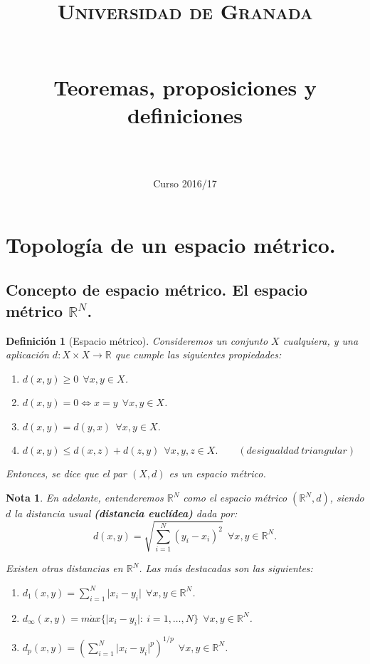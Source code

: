 \documentclass[11pt, a4paper, titlepage]{article}
\title{
  \normalfont \normalsize 
  \textsc{Universidad de Granada} \\ [25pt]    %
  \horrule{0.5pt} \\[0.4cm] %
  \huge \subject\\  \Large Teoremas, proposiciones y definiciones\\ %
  \horrule{2pt} \\[0.5cm] %
}
\author{\large{\docauthor}}
\date{\vspace{-1.5em} \normalsize Curso 2016/17}
\providecommand{\abs}[1]{\lvert#1\rvert}
\theoremstyle{theorem-style}
\theoremstyle{definition-style}
\newtheorem*{ndef}{Definición}
\theoremstyle{remark-style}
\newtheorem*{nota}{Nota}
\theoremstyle{example-style}
\newenvironment{nlist}
{\begin{enumerate}
\renewcommand\labelenumi{(\emph{\roman{enumi})}}}
{\end{enumerate}}
\begin{document}
\maketitle  %
\tableofcontents
\newpage

\section{Topología de un espacio métrico.}

\subsection{Concepto de espacio métrico. El espacio métrico $\mathbb{R}^N$.}

\begin{ndef}[Espacio métrico]
Consideremos un conjunto $X$ cualquiera, y una aplicación \mbox{$d:X\times X \longrightarrow \mathbb{R}$} que cumple las siguientes propiedades:

\begin{nlist}
\item $d(x,y) \ge 0\ \ \forall x,y \in X$.

\item $d(x,y) = 0 \iff x = y\ \ \forall x,y \in X$.

\item $d(x,y) = d(y,x)\ \ \forall x,y \in X$.

\item $d(x,y) \leq d(x,z) + d(z,y)\ \ \forall x,y,z \in X. \quad \quad(desigualdad\ triangular)$

\end{nlist}

Entonces, se dice que el par $(X,d)$ es un \emph{espacio métrico}.
\end{ndef}



\begin{nota}
En adelante, entenderemos $\mathbb{R}^N$ como el espacio métrico $(\mathbb{R}^N,d)$, siendo $d$ la distancia usual \textbf{(distancia euclídea)} dada por: $$d(x,y) = \sqrt{\sum_{i=1}^N (y_i - x_i)^2}\ \ \forall x,y\in \mathbb{R}^N.$$

Existen otras distancias en $\mathbb{R}^N$. Las más destacadas son las siguientes:

\begin{nlist}
\item $\displaystyle d_1(x,y) = \sum_{i=1}^N \abs{x_i - y_i}\ \ \forall x,y \in \mathbb{R}^N$.

\item $\displaystyle d_{\infty}(x,y) = m\acute{a}x \{\abs{x_i - y_i}: \ i=1,\dots,N \}\ \ \forall x,y\in \mathbb{R}^N$.

\item $\displaystyle d_p(x,y) = \left( \sum_{i=1}^N \abs{x_i - y_i}^p \right)^{1/p}\ \ \forall x,y\in \mathbb{R}^N$.\\
\end{nlist}

\end{nota}
\end{document}
